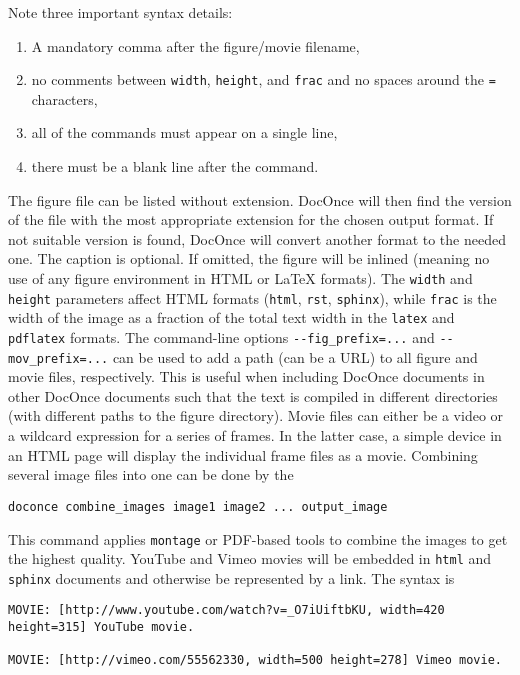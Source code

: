 \documentclass[%
oneside,                 %
final,                   %
10pt]{article}
\newcounter{doconce:movie:counter}
\begin{document}
Note three important syntax details:
\begin{enumerate}
 \item A mandatory comma after the figure/movie filename,
 \item no comments between \texttt{width}, \texttt{height}, and \texttt{frac} and no spaces
    around the \texttt{=} characters,
 \item all of the commands must appear on a single line,
 \item there must be a blank line after the command.
\end{enumerate}
\noindent
The figure file can be listed without extension. DocOnce will then find
the version of the file with the most appropriate extension for the chosen
output format. If not suitable version is found, DocOnce will convert
another format to the needed one.
The caption is optional. If omitted, the figure will be inlined (meaning
no use of any figure environment in HTML or {\LaTeX} formats). The \texttt{width}
and \texttt{height} parameters affect HTML formats (\texttt{html}, \texttt{rst}, \texttt{sphinx}),
while \texttt{frac} is the width of the image as a fraction of the total text
width in the \texttt{latex} and \texttt{pdflatex} formats.
The command-line options \Verb!--fig_prefix=...! and \Verb!--mov_prefix=...! can
be used to add a path (can be a URL) to all figure and movie files,
respectively.  This is useful when including DocOnce documents in
other DocOnce documents such that the text is compiled in different
directories (with different paths to the figure directory).
Movie files can either be a video or a wildcard expression for a
series of frames. In the latter case, a simple device in an HTML page
will display the individual frame files as a movie.
Combining several image files into one can be done by the
\begin{Verbatim}[numbers=none,fontsize=\fontsize{9pt}{9pt},baselinestretch=0.95,xleftmargin=2mm]
doconce combine_images image1 image2 ... output_image

\end{Verbatim}

This command applies \texttt{montage} or PDF-based tools to combine the images
to get the highest quality.
YouTube and Vimeo movies will be embedded in \texttt{html} and \texttt{sphinx} documents
and otherwise be represented by a link. The syntax is
\begin{Verbatim}[numbers=none,fontsize=\fontsize{9pt}{9pt},baselinestretch=0.95,xleftmargin=2mm]
MOVIE: [http://www.youtube.com/watch?v=_O7iUiftbKU, width=420 height=315] YouTube movie.

MOVIE: [http://vimeo.com/55562330, width=500 height=278] Vimeo movie.


\end{Verbatim}
\end{document}
